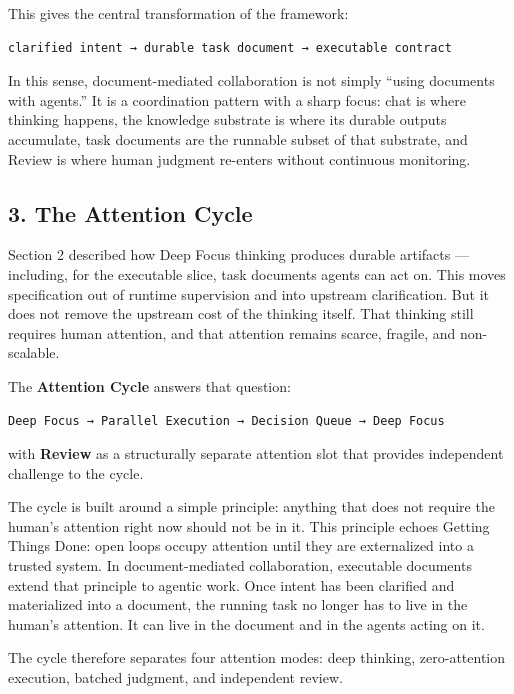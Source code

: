 \documentclass[
  nonatbib,
  preprint]{article}
\begin{document}
This gives the central transformation of the framework:

\begin{verbatim}
clarified intent → durable task document → executable contract
\end{verbatim}

In this sense, document-mediated collaboration is not simply ``using
documents with agents.'' It is a coordination pattern with a sharp
focus: chat is where thinking happens, the knowledge substrate is where
its durable outputs accumulate, task documents are the runnable subset
of that substrate, and Review is where human judgment re-enters without
continuous monitoring.

\subsection{\texorpdfstring{\textbf{3. The Attention
Cycle}}{3. The Attention Cycle}}\label{the-attention-cycle-1}

Section 2 described how Deep Focus thinking produces durable artifacts
--- including, for the executable slice, task documents agents can act
on. This moves specification out of runtime supervision and into
upstream clarification. But it does not remove the upstream cost of the
thinking itself. That thinking still requires human attention, and that
attention remains scarce, fragile, and non-scalable.

The \textbf{Attention Cycle} answers that question:

\begin{verbatim}
Deep Focus → Parallel Execution → Decision Queue → Deep Focus
\end{verbatim}

with \textbf{Review} as a structurally separate attention slot that
provides independent challenge to the cycle.

The cycle is built around a simple principle: anything that does not
require the human's attention right now should not be in it. This
principle echoes Getting Things Done: open loops occupy attention until
they are externalized into a trusted system. In document-mediated
collaboration, executable documents extend that principle to agentic
work. Once intent has been clarified and materialized into a document,
the running task no longer has to live in the human's attention. It can
live in the document and in the agents acting on it.

The cycle therefore separates four attention modes: deep thinking,
zero-attention execution, batched judgment, and independent review.
\end{document}
